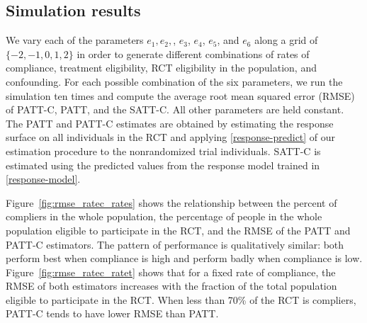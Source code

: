 \documentclass[hidelinks,12pt]{article}
\begin{document}
{\subsection{Simulation results}\label{sim-results}

{\color{red}We vary each of the parameters $e_1, e_2,$, $e_3$, $e_4$, $e_5$, and $e_6$ along a grid of $\{-2, -1, 0, 1, 2\}$ in order to generate different combinations of rates of compliance, treatment eligibility, RCT eligibility in the population, and confounding. For each possible combination of the six parameters, we run the simulation ten times and compute the average root mean squared error (RMSE) of PATT-C, PATT, and the SATT-C.} All other parameters are held constant. The PATT and PATT-C estimates are obtained by estimating the response surface on all individuals in the RCT and applying \ref{response-predict} of our estimation procedure to the nonrandomized trial individuals. {\color{red}SATT-C is estimated using the predicted values from the response model trained in \ref{response-model}.}

Figure~\ref{fig:rmse_ratec_rates} shows the relationship between the percent of compliers in the whole population, the percentage of people in the whole population eligible to participate in the RCT, and the RMSE of the PATT and PATT-C estimators. The pattern of performance is qualitatively similar: both perform best when compliance is high and perform badly when compliance is low. {\color{red}Figure~\ref{fig:rmse_ratec_ratet}} shows that for a fixed rate of compliance, the RMSE of both estimators increases with the fraction of the total population eligible to participate in the RCT. When less than 70\% of the RCT is compliers, PATT-C tends to have lower RMSE than PATT.
%

}
\end{document}
